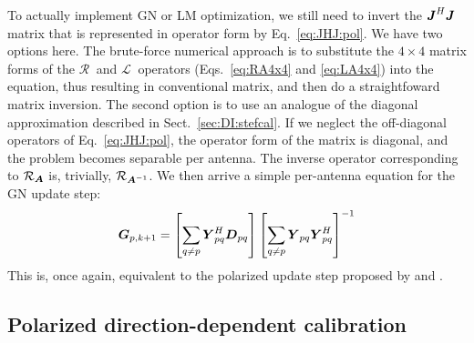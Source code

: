 \documentclass[useAMS,usenatbib]{mn2e}
\newcommand{\mat}[1]{{\bmath{#1}}}
\newcommand{\JJ}{\mat{J}} %
\newcommand{\DD}{\mat{D}}
\newcommand{\GG}{\mat{G}}
\newcommand{\JHJ}{\JJ^H\JJ} %
\newcommand{\Rop}[1]{\mathcal{R}_{{#1}}}
\newcommand{\Lop}[1]{\mathcal{L}_{{#1}}}
\newcommand{\StefCal}{{\sc StefCal}}
\numberwithin{equation}{section}
\begin{document}
To actually implement GN or LM optimization, we still need to invert the  $\JHJ$ matrix that is represented in operator form 
by Eq.~\ref{eq:JHJ:pol}. We have two options here. The brute-force numerical approach is to substitute the 
$4\times4$ matrix forms of the $\Rop{~}$ and $\Lop{~}$ operators (Eqs.~\ref{eq:RA4x4} and \ref{eq:LA4x4}) into the 
equation, thus resulting in conventional matrix,
and then do a straightfoward matrix inversion. The second option is to use an analogue of the diagonal 
approximation described in Sect.~\ref{sec:DI:stefcal}. If we neglect the off-diagonal operators of Eq.~\ref{eq:JHJ:pol}, 
the operator form of the matrix is diagonal, and the problem becomes separable per antenna. The inverse operator 
corresponding to $\Rop{\mat{A}}$ is, trivially, $\Rop{\mat{A}^{-1}}$. We then arrive a simple per-antenna equation 
for the GN update step:
\begin{equation}
\label{eq:update:DI:diag:pol}
\GG_{p,k+1} =  
\left [ \sum\limits_{q\ne p} \YY^H_{pq} \DD_{pq} \right ] 
\left [ \sum\limits_{q\ne p} \YY_{pq} \YY^H_{pq}  \right ]^{-1}
\end{equation}
This is, once again, equivalent to the polarized {\sc \StefCal} update step proposed by \citet{OMS-Stefcal} and \citet{Stefcal}.




\subsection{Polarized direction-dependent calibration}
\end{document}
